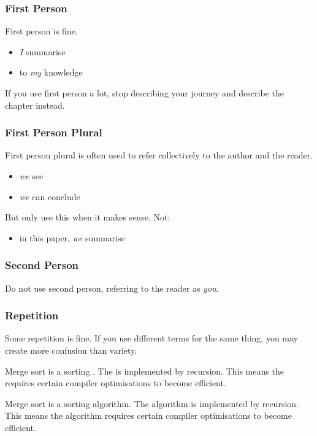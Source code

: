 \begin{frame}
  \frametitle{First Person}

  First person is fine.
  \begin{itemize}
    \item \emph{I} summarise
    \item to \emph{my} knowledge
  \end{itemize}

  \medskip
  \pause

  If you use first person a lot, stop describing your journey and describe the chapter instead.
\end{frame}

\begin{frame}
  \frametitle{First Person Plural}

  First person plural is often used to refer collectively to the author and the reader.
  \begin{itemize}
    \item \emph{we} see
    \item \emph{we} can conclude
  \end{itemize}

  \medskip
  \pause

  But only use this when it makes sense. Not:
  \begin{itemize}
    \item in this paper, \emph{we} summarise
  \end{itemize}
\end{frame}

\begin{frame}
  \frametitle{Second Person}

  Do not use second person, referring to the reader as \emph{you}.
\end{frame}

\begin{frame}
  \frametitle{Repetition}

  Some repetition is fine.
  If you use different terms for the same thing, you may create more confusion than variety.

  \medskip
  \pause


  {
    \small
    Merge sort is a sorting .
    The  is implemented by recursion.
    This means the  requires certain compiler optimisations to become efficient.
  }

  \medskip
  \pause


  {
    \small
    Merge sort is a sorting algorithm.
    The algorithm is implemented by recursion.
    This means the algorithm requires certain compiler optimisations to become efficient.
  }
\end{frame}

